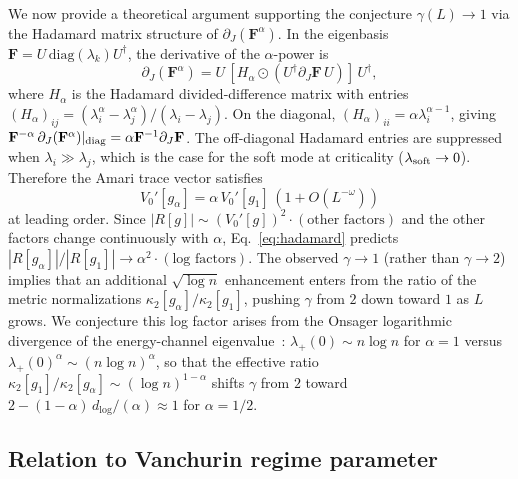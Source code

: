 \documentclass[twocolumn,showpacs,preprintnumbers,amsmath,amssymb,prl]{revtex4-2}
\newcommand{\Fmat}{\mathbf{F}}
\begin{document}
We now provide a theoretical argument supporting the conjecture $\gamma(L) \to 1$
via the Hadamard matrix structure of $\partial_J(\Fmat^\alpha)$.
In the eigenbasis $\Fmat = U\,\mathrm{diag}(\lambda_k) U^\dagger$, the
derivative of the $\alpha$-power is
\begin{equation}
  \partial_J(\Fmat^\alpha) = U\,[H_\alpha \odot (U^\dagger \partial_J \Fmat\, U)]\,U^\dagger,
\end{equation}
where $H_\alpha$ is the Hadamard divided-difference matrix with entries
$(H_\alpha)_{ij} = (\lambda_i^\alpha - \lambda_j^\alpha)/(\lambda_i - \lambda_j)$.
On the diagonal, $(H_\alpha)_{ii} = \alpha\lambda_i^{\alpha-1}$, giving
$\Fmat^{-\alpha}\,\partial_J(\Fmat^\alpha)|_{\rm diag} = \alpha\Fmat^{-1}\partial_J\Fmat$.
The off-diagonal Hadamard entries are suppressed when $\lambda_i \gg \lambda_j$,
which is the case for the soft mode at criticality ($\lambda_{\rm soft} \to 0$).
Therefore the Amari trace vector satisfies
\begin{equation}
  \label{eq:hadamard}
  V_0'[g_\alpha] = \alpha\,V_0'[g_1]\,(1 + O(L^{-\omega}))
\end{equation}
at leading order.
Since $|R[g]| \sim (V_0'[g])^2 \cdot (\text{other factors})$ and the other
factors change continuously with $\alpha$, Eq.~\eqref{eq:hadamard} predicts
$|R[g_\alpha]|/|R[g_1]| \to \alpha^2 \cdot (\text{log factors})$.
The observed $\gamma \to 1$ (rather than $\gamma \to 2$) implies that an
additional $\sqrt{\log n}$ enhancement enters from the ratio of the metric
normalizations $\kappa_2[g_\alpha]/\kappa_2[g_1]$, pushing $\gamma$ from $2$
down toward $1$ as $L$ grows.
We conjecture this log factor arises from the Onsager logarithmic divergence of
the energy-channel eigenvalue~\cite{Onsager1944}:
$\lambda_+(0) \sim n\log n$ for $\alpha = 1$ versus $\lambda_+(0)^\alpha \sim (n\log n)^\alpha$,
so that the effective ratio $\kappa_2[g_1]/\kappa_2[g_\alpha] \sim (\log n)^{1-\alpha}$
shifts $\gamma$ from $2$ toward $2 - (1-\alpha)\,d_{\log}/(\alpha) \approx 1$ for $\alpha=1/2$.

\subsection{Relation to Vanchurin regime parameter}
\end{document}

